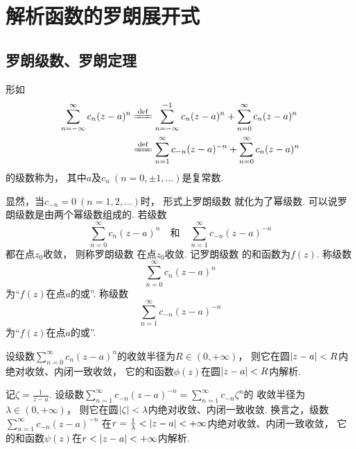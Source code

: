 \section{解析函数的罗朗展开式}
\subsection{罗朗级数、罗朗定理}
\begin{definition}
形如\begin{equation}\label{equation:解析函数的级数表示.罗朗级数}
\begin{split}
\sum_{n=-\infty}^\infty c_n (z-a)^n
&\defeq \sum_{n=-\infty}^{-1} c_n (z-a)^n + \sum_{n=0}^\infty c_n (z-a)^n \\
&\defeq \sum_{n=1}^\infty c_{-n} (z-a)^{-n} + \sum_{n=0}^\infty c_n (z-a)^n
\end{split}
\end{equation}的级数称为，
其中\(a\)及\(c_n\ (n=0,\pm1,\dotsc)\)是复常数.
\end{definition}
显然，当\(c_{-n}=0\ (n=1,2,\dotsc)\)时，
形式上罗朗级数  就化为了幂级数.
可以说罗朗级数是由两个幂级数组成的.
若级数\[
	\sum_{n=0}^\infty c_n (z-a)^n
	\quad\text{和}\quad
	\sum_{n=1}^\infty c_{-n} (z-a)^{-n}
\]都在点\(z_0\)收敛，
则称罗朗级数  在点\(z_0\)收敛.
记罗朗级数  的和函数为\(f(z)\).
称级数\[
	\sum_{n=0}^\infty c_n (z-a)^n
\]为“\(f(z)\)在点\(a\)的或”.
称级数\[
	\sum_{n=1}^\infty c_{-n} (z-a)^{-n}
\]为“\(f(z)\)在点\(a\)的或”.

设级数\(\sum_{n=0}^\infty c_n (z-a)^n\)的收敛半径为\(R \in (0,+\infty)\)，
则它在圆\(\abs{z-a}<R\)内绝对收敛、内闭一致收敛，
它的和函数\(\phi(z)\)在圆\(\abs{z-a}<R\)内解析.

记\(\zeta = \frac{1}{z-a}\).
设级数\(\sum_{n=1}^\infty c_{-n} (z-a)^{-n} = \sum_{n=1}^\infty c_{-n} \zeta^n\)的
收敛半径为\(\lambda \in (0,+\infty)\)，
则它在圆\(\abs{\zeta} < \lambda\)内绝对收敛、内闭一致收敛.
换言之，级数\(\sum_{n=1}^\infty c_{-n} (z-a)^{-n}\)
在\(r = \frac{1}{\lambda} < \abs{z-a} < +\infty\)内绝对收敛、内闭一致收敛，
它的和函数\(\psi(z)\)在\(r < \abs{z-a} < +\infty\)内解析.

